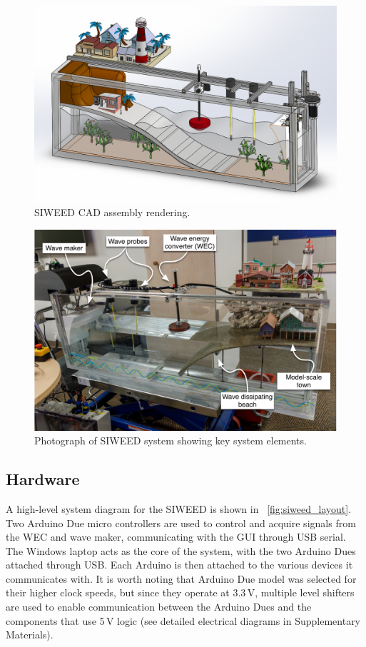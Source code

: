 \documentclass[hardware,article,submit,pdftex,moreauthors]{Definitions/mdpi}
\begin{document}
\begin{figure}[tb]
  \centering
  \includegraphics[width=1\textwidth]{diagrams/SIWEED_CAD.png}
  \caption{SIWEED CAD assembly rendering.}
  \label{fig:CAD}
\end{figure}

\begin{figure}[tb]
  \centering
  \includegraphics[width=1\textwidth]{diagrams/siweed_photo_with_callouts.pdf}
  \caption{Photograph of SIWEED system showing key system elements.}
  \label{fig:siweed_photo_with_callouts}
\end{figure}

\subsection{Hardware}
A high-level system diagram for the SIWEED is shown in \figurename~\ref{fig:siweed_layout}.
Two Arduino Due micro controllers are used to control and acquire signals from the WEC and wave maker, communicating with the GUI through USB serial.
The Windows laptop acts as the core of the system, with the two Arduino Dues attached through USB. 
Each Arduino is then attached to the various devices it communicates with.
It is worth noting that Arduino Due model was selected for their higher clock speeds, but since they operate at 3.3\,V, multiple level shifters are used to enable communication between the Arduino Dues and the components that use 5\,V logic (see detailed electrical diagrams in Supplementary Materials).
\end{document}
